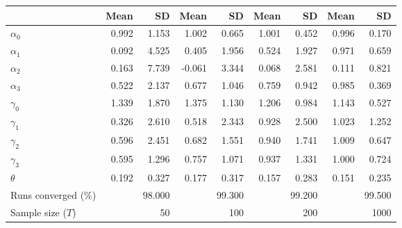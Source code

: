 
\begin{tabular}[t]{lrrrrrrrr}
\toprule
  & Mean & SD & Mean  & SD  & Mean   & SD   & Mean    & SD   \\
\midrule
$\alpha_{0}$ & 0.992 & 1.153 & 1.002 & 0.665 & 1.001 & 0.452 & 0.996 & 0.170\\
$\alpha_{1}$ & 0.092 & 4.525 & 0.405 & 1.956 & 0.524 & 1.927 & 0.971 & 0.659\\
$\alpha_{2}$ & 0.163 & 7.739 & -0.061 & 3.344 & 0.068 & 2.581 & 0.111 & 0.821\\
$\alpha_{3}$ & 0.522 & 2.137 & 0.677 & 1.046 & 0.759 & 0.942 & 0.985 & 0.369\\
$\gamma_{0}$ & 1.339 & 1.870 & 1.375 & 1.130 & 1.206 & 0.984 & 1.143 & 0.527\\
$\gamma_{1}$ & 0.326 & 2.610 & 0.518 & 2.343 & 0.928 & 2.500 & 1.023 & 1.252\\
$\gamma_{2}$ & 0.596 & 2.451 & 0.682 & 1.551 & 0.940 & 1.741 & 1.009 & 0.647\\
$\gamma_{3}$ & 0.595 & 1.296 & 0.757 & 1.071 & 0.937 & 1.331 & 1.000 & 0.724\\
$\theta$ & 0.192 & 0.327 & 0.177 & 0.317 & 0.157 & 0.283 & 0.151 & 0.235\\
Runs converged (\%) &  & 98.000 &  & 99.300 &  & 99.200 &  & 99.500\\
Sample size ($T$) &  & 50 &  & 100 &  & 200 &  & 1000\\
\bottomrule
\end{tabular}
